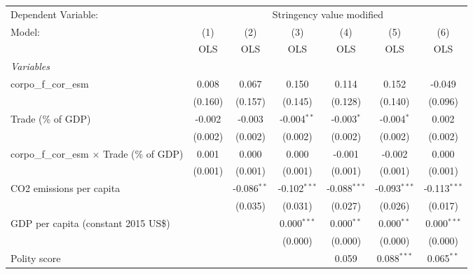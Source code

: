 
\begingroup
\centering
\begin{tabular}{lcccccc}
   \toprule
   Dependent Variable: & \multicolumn{6}{c}{Stringency value modified}\\
   Model:                                             & (1)     & (2)           & (3)            & (4)            & (5)            & (6)\\  
                                                      &  OLS    & OLS           & OLS            & OLS            & OLS            & OLS\\  
   \midrule
   \emph{Variables}\\
   corpo\_f\_cor\_esm                                 & 0.008   & 0.067         & 0.150          & 0.114          & 0.152          & -0.049\\   
                                                      & (0.160) & (0.157)       & (0.145)        & (0.128)        & (0.140)        & (0.096)\\   
   Trade (\% of GDP)                                  & -0.002  & -0.003        & -0.004$^{**}$  & -0.003$^{*}$   & -0.004$^{*}$   & 0.002\\   
                                                      & (0.002) & (0.002)       & (0.002)        & (0.002)        & (0.002)        & (0.002)\\   
   corpo\_f\_cor\_esm $\times$ Trade (\% of GDP)      & 0.001   & 0.000         & 0.000          & -0.001         & -0.002         & 0.000\\   
                                                      & (0.001) & (0.001)       & (0.001)        & (0.001)        & (0.001)        & (0.001)\\   
   CO2 emissions per capita                           &         & -0.086$^{**}$ & -0.102$^{***}$ & -0.088$^{***}$ & -0.093$^{***}$ & -0.113$^{***}$\\   
                                                      &         & (0.035)       & (0.031)        & (0.027)        & (0.026)        & (0.017)\\   
   GDP per capita (constant 2015 US\$)                &         &               & 0.000$^{***}$  & 0.000$^{**}$   & 0.000$^{**}$   & 0.000$^{***}$\\   
                                                      &         &               & (0.000)        & (0.000)        & (0.000)        & (0.000)\\   
   Polity score                                       &         &               &                & 0.059          & 0.088$^{***}$  & 0.065$^{**}$\\   

\end{tabular}
